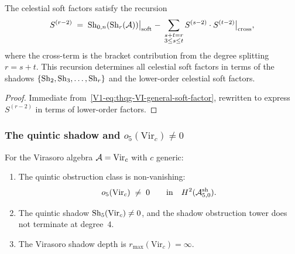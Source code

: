 \begin{corollary}
\label{cor:thqg-VI-soft-recursion}
The celestial soft factors satisfy the recursion
\begin{equation}%
S^{(r-2)}
\;=\;
\Sh_{0,n}(\Sh_r(\cA))\bigl|_{\text{soft}}
\;-\;
\sum_{\substack{s+t=r \\ 3 \leq s \leq t}}
S^{(s-2)} \cdot S^{(t-2)}\bigl|_{\text{cross}},
\end{equation}
where the cross-term is the bracket contribution from the degree
splitting $r = s + t$. This recursion determines all celestial soft factors
in terms of the shadows $\{\operatorname{Sh}_2, \operatorname{Sh}_3, \dotsc, \operatorname{Sh}_r\}$ and
the lower-order celestial soft factors.
\end{corollary}

\begin{proof}
Immediate from~\eqref{V1-eq:thqg-VI-general-soft-factor}, rewritten
to express $S^{(r-2)}$ in terms of lower-order factors.
\end{proof}

\subsubsection{The quintic shadow and $o_5(\mathrm{Vir}_c) \neq 0$}

\begin{theorem}
For the Virasoro algebra $\mathcal{A} = \mathrm{Vir}_c$ with $c$ generic:
\begin{enumerate}[label=\textup{(\roman*)}]
\item The quintic obstruction class is non-vanishing:
\begin{equation}%
o_5(\mathrm{Vir}_c) \;\neq\; 0
\qquad\text{in}\quad
H^2(\cA^{\mathrm{sh}}_{5,0}).
\end{equation}
\item The quintic shadow $\operatorname{Sh}_5(\mathrm{Vir}_c) \neq 0$, and
 the shadow obstruction tower does not terminate at degree~$4$.
\item The Virasoro shadow depth is $r_{\max}(\mathrm{Vir}_c) = \infty$.
\end{enumerate}
\end{theorem}

